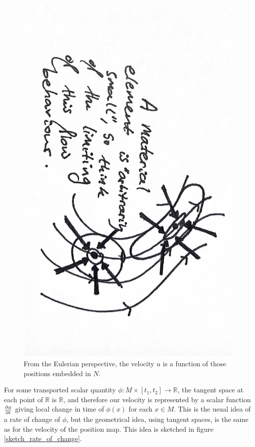 \begin{figure}[H]
\centerline{\includegraphics[angle=90,page=2,width=0.8\linewidth]{figures/2.pdf}}
\caption{\small
    From the Eulerian perspective, the velocity $u$ is a function of those positions embedded in $N$.
}
\label{sketch_velocity}
\end{figure}
For some transported scalar quantity $\phi : M \times [t_1, t_2] \rightarrow \mathbb{R}$, the tangent space at each point of $\mathbb{R}$ is $\mathbb{R}$,
and therefore our velocity is represented by a scalar function $\frac{\partial \phi}{\partial t}$ giving local change in time of $\phi(x)$ for each $x \in M$.
This is the usual idea of a rate of change of $\phi$, but the geometrical idea, using tangent spaces, is the same as for the velocity of the position map.
This idea is sketched in figure \ref{sketch_rate_of_change}.
